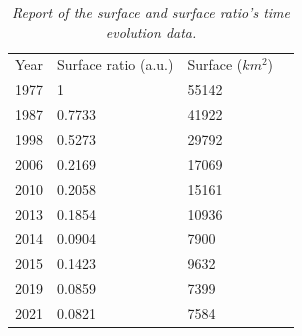 \begin{table}[H]
	\centering
    \begin{tabular}{|l|l|l|l}
    \cline{1-3}
    Year & Surface ratio (a.u.) & Surface ($km^2$) & \\ \cline{1-3}
    1977 & 1                    &            55142 & \\ \cline{1-3}
    1987 & 0.7733               &            41922 & \\ \cline{1-3}
    1998 & 0.5273               &            29792 & \\ \cline{1-3}
    2006 & 0.2169               &            17069 & \\ \cline{1-3}
    2010 & 0.2058               &            15161 & \\ \cline{1-3}
    2013 & 0.1854               &            10936 & \\ \cline{1-3}
    2014 & 0.0904               &             7900 & \\ \cline{1-3}
    2015 & 0.1423               &             9632 & \\ \cline{1-3}
    2019 & 0.0859               &             7399 & \\ \cline{1-3}
    2021 & 0.0821               &             7584 & \\ \cline{1-3}
    \end{tabular}
    \caption{\emph{Report of the surface and surface ratio's time evolution data.}}
    \label{tab:table}
\end{table}
